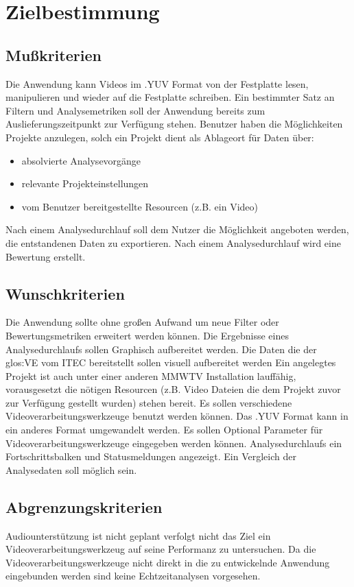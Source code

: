 \chapter{Zielbestimmung}

\section{Mußkriterien}
\setcounter{counterKriterien}{0}
 
 Die Anwendung kann Videos im .YUV Format von der Festplatte lesen, manipulieren und wieder auf die Festplatte schreiben.
 Ein bestimmter Satz an Filtern und Analysemetriken soll der Anwendung bereits zum Auslieferungszeitpunkt zur Verfügung stehen.
 Benutzer haben die Möglichkeiten Projekte anzulegen, solch ein Projekt dient als Ablageort für Daten über:
\begin{itemize}
\item absolvierte Analysevorgänge
\item relevante Projekteinstellungen
\item vom Benutzer bereitgestellte Resourcen (z.B. ein Video)
\end{itemize}
 Nach einem Analysedurchlauf soll dem Nutzer die Möglichkeit angeboten werden, die entstandenen Daten zu exportieren.
 Nach einem Analysedurchlauf wird eine Bewertung erstellt.

\section{Wunschkriterien}
\setcounter{counterKriterien}{0}
 Die Anwendung sollte ohne großen Aufwand um neue Filter oder Bewertungsmetriken erweitert werden können.
 Die Ergebnisse eines Analysedurchlaufs sollen Graphisch aufbereitet werden.
 Die Daten die der \gls{glos:VE} vom \gls{ITEC}  bereitstellt sollen visuell aufbereitet werden
 Ein angelegtes Projekt ist auch unter einer anderen MMWTV Installation lauffähig, vorausgesetzt die nötigen Resourcen (z.B. Video Dateien die dem Projekt zuvor zur Verfügung gestellt wurden) stehen bereit.
 Es sollen verschiedene Videoverarbeitungswerkzeuge benutzt werden können.
 Das .YUV Format kann in ein anderes Format umgewandelt werden.
 Es sollen Optional Parameter für Videoverarbeitungswerkzeuge eingegeben werden können.
 Analysedurchlaufs ein Fortschrittsbalken und Statusmeldungen angezeigt.
 Ein Vergleich der Analysedaten soll möglich sein.

\section{Abgrenzungskriterien}
\setcounter{counterKriterien}{0}
 Audiounterstützung ist nicht geplant
 \projektTitel verfolgt nicht das Ziel ein Videoverarbeitungswerkzeug auf seine Performanz zu untersuchen.
 Da die Videoverarbeitungswerkzeuge nicht direkt in die zu entwickelnde Anwendung eingebunden werden sind keine Echtzeitanalysen vorgesehen.

